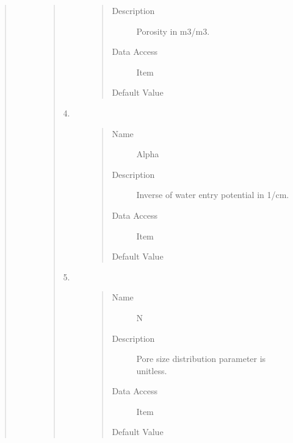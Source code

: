 \documentclass[letterpaper,10pt,english]{sphinxmanual}
\begin{document}
\begin{quote}
\begin{description}
\begin{quote}
\begin{description}
\begin{quote}
\begin{description}
\item[{Description}] \leavevmode
Porosity in m3/m3.

\item[{Data Access}] \leavevmode
Item

\item[{Default Value}] \leavevmode
{}

\end{description}\end{quote}

\item[{4.}] \leavevmode\begin{quote}\begin{description}
\item[{Name}] \leavevmode
Alpha

\item[{Description}] \leavevmode
Inverse of water entry potential in 1/cm.

\item[{Data Access}] \leavevmode
Item

\item[{Default Value}] \leavevmode
{}

\end{description}\end{quote}

\item[{5.}] \leavevmode\begin{quote}\begin{description}
\item[{Name}] \leavevmode
N

\item[{Description}] \leavevmode
Pore size distribution parameter is unitless.

\item[{Data Access}] \leavevmode
Item

\item[{Default Value}] \leavevmode
{}

\end{description}\end{quote}


\end{description}
\end{quote}
\end{description}
\end{quote}
\end{document}
